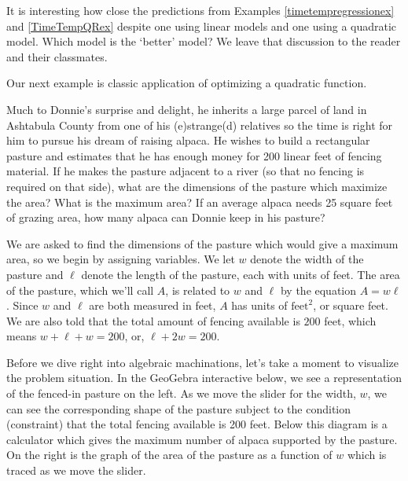 \documentclass{ximera}
\begin{document}
It is interesting how close the predictions from  Examples \ref{timetempregressionex} and  \ref{TimeTempQRex} despite one using linear models and one using a quadratic model.  Which model is the `better' model?  We leave that discussion to the reader and their classmates.

Our next example is classic application of optimizing a quadratic function.

\begin{example} \label{donniealpaca} Much to Donnie's surprise and delight, he inherits a large parcel of land in Ashtabula County from one of his (e)strange(d) relatives so the time is right for him to pursue his dream of raising alpaca.  He wishes to build a rectangular pasture and estimates that he has enough money for 200 linear feet of fencing material.  If he makes the pasture adjacent to a river (so that no fencing is required on that side), what are the dimensions of the pasture which maximize the area?  What is the maximum area?  If an average alpaca needs 25 square feet of grazing area, how many alpaca can Donnie keep in his pasture?


\begin{explanation} We are asked to find the dimensions of the pasture which would give a maximum area, so we begin by assigning variables. We let $w$ denote the width of the pasture and $\ell$ denote the length of the pasture, each with units of feet.  The area of the pasture, which we'll call $A$, is related to $w$ and $\ell$ by the equation $A = w \ell$.  Since $w$ and $\ell$ are both measured in feet, $A$ has units of $\text{feet}^2$, or square feet. We are also told that the total amount of fencing available is $200$ feet, which means $w + \ell + w = 200$, or, $\ell+2w = 200$.  

\medskip

Before we dive right into algebraic machinations, let's take a moment to visualize the problem situation.  In the GeoGebra interactive below, we see a representation of the fenced-in pasture on the left.  As we move the slider for the width, $w$, we can see the corresponding shape of the pasture subject to the condition (constraint) that the total fencing available is 200 feet.  Below this diagram is a calculator which gives the maximum number of alpaca supported by the pasture. On the right is the graph of the area of the pasture as a function of $w$  which is traced as we move the slider.



\end{explanation}
\end{example}
\end{document}
